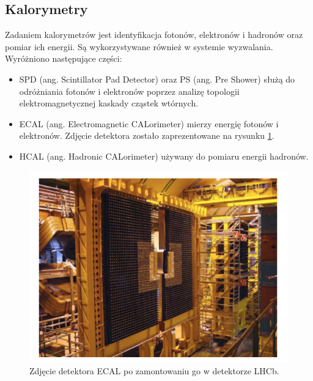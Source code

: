 \subsection{Kalorymetry}
Zadaniem  kalorymetrów jest identyfikacja fotonów, elektronów i hadronów oraz pomiar ich energii. Są wykorzystywane również w systemie wyzwalania. Wyróżniono następujące części:
\begin{itemize}
\item SPD (ang. Scintillator Pad Detector) oraz PS (ang. Pre Shower) służą do odróżniania fotonów i elektronów poprzez analizę topologii elektromagnetycznej kaskady cząstek wtórnych.
\item ECAL (ang. Electromagnetic CALorimeter) mierzy energię fotonów i elektronów. Zdjęcie detektora zostało zaprezentowane na rysunku \ref{fig:ECAl}.
\item HCAL (ang. Hadronic CALorimeter) używany do pomiaru energii hadronów.
\end{itemize}
\begin{figure}[th] 
  \centering
  \includegraphics[scale=0.4]{rozdzial2/ECAL.png}
  \caption{Zdjęcie detektora ECAL po zamontowaniu go w detektorze LHCb.}
  \label{fig:ECAl}
\end{figure}



